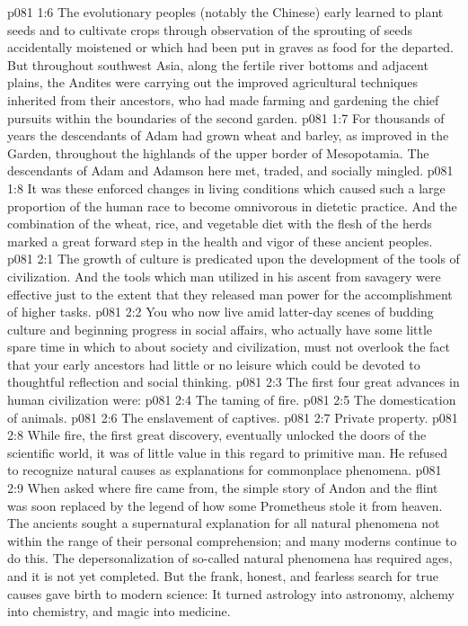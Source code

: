 \vs p081 1:6 The evolutionary peoples (notably the Chinese) early learned to plant seeds and to cultivate crops through observation of the sprouting of seeds accidentally moistened or which had been put in graves as food for the departed. But throughout southwest Asia, along the fertile river bottoms and adjacent plains, the Andites were carrying out the improved agricultural techniques inherited from their ancestors, who had made farming and gardening the chief pursuits within the boundaries of the second garden.
\vs p081 1:7 For thousands of years the descendants of Adam had grown wheat and barley, as improved in the Garden, throughout the highlands of the upper border of Mesopotamia. The descendants of Adam and Adamson here met, traded, and socially mingled.\plusone
\vs p081 1:8 It was these enforced changes in living conditions which caused such a large proportion of the human race to become omnivorous in dietetic practice. And the combination of the wheat, rice, and vegetable diet with the flesh of the herds marked a great forward step in the health and vigor of these ancient peoples.
\vs p081 2:1 The growth of culture is predicated upon the development of the tools of civilization. And the tools which man utilized in his ascent from savagery were effective just to the extent that they released man power for the accomplishment of higher tasks.
\vs p081 2:2 You who now live amid latter\hyp{}day scenes of budding culture and beginning progress in social affairs, who actually have some little spare time in which to  about society and civilization, must not overlook the fact that your early ancestors had little or no leisure which could be devoted to thoughtful reflection and social thinking.
\pc \vs p081 2:3 The first four great advances in human civilization were:
\pc \vs p081 2:4 \bibnobreakspace The taming of fire.
\vs p081 2:5 \bibnobreakspace The domestication of animals.
\vs p081 2:6 \bibnobreakspace The enslavement of captives.
\vs p081 2:7 \bibnobreakspace Private property.
\pc \vs p081 2:8 While fire, the first great discovery, eventually unlocked the doors of the scientific world, it was of little value in this regard to primitive man. He refused to recognize natural causes as explanations for commonplace phenomena.
\vs p081 2:9 When asked where fire came from, the simple story of Andon and the flint was soon replaced by the legend of how some Prometheus stole it from heaven. The ancients sought a supernatural explanation for all natural phenomena not within the range of their personal comprehension; and many moderns continue to do this. The depersonalization of so\hyp{}called natural phenomena has required ages, and it is not yet completed. But the frank, honest, and fearless search for true causes gave birth to modern science: It turned astrology into astronomy, alchemy into chemistry, and magic into medicine.
